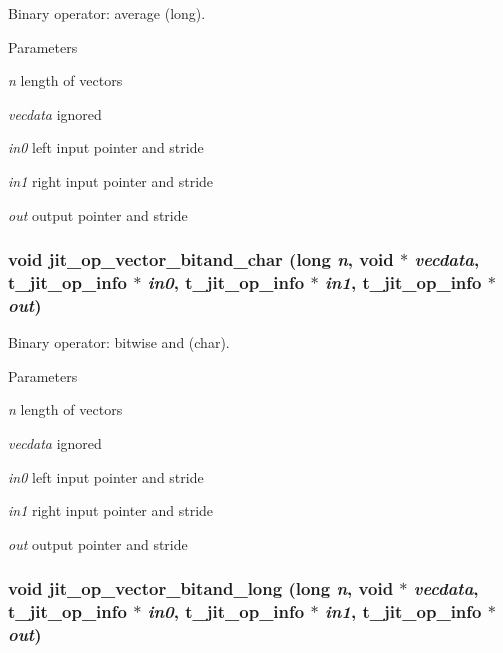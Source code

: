Binary operator: average (long). 
\begin{DoxyParams}{Parameters}
\item[{\em n}]length of vectors \item[{\em vecdata}]ignored \item[{\em in0}]left input pointer and stride \item[{\em in1}]right input pointer and stride \item[{\em out}]output pointer and stride \end{DoxyParams}
\hypertarget{group__opvecmod_ga06089d7ed6a436ec5b392fa5de518efd}{
\subsubsection[{jit\_\-op\_\-vector\_\-bitand\_\-char}]{\setlength{\rightskip}{0pt plus 5cm}void jit\_\-op\_\-vector\_\-bitand\_\-char (long {\em n}, \/  void $\ast$ {\em vecdata}, \/  {\bf t\_\-jit\_\-op\_\-info} $\ast$ {\em in0}, \/  {\bf t\_\-jit\_\-op\_\-info} $\ast$ {\em in1}, \/  {\bf t\_\-jit\_\-op\_\-info} $\ast$ {\em out})}}
\label{group__opvecmod_ga06089d7ed6a436ec5b392fa5de518efd}


Binary operator: bitwise and (char). 
\begin{DoxyParams}{Parameters}
\item[{\em n}]length of vectors \item[{\em vecdata}]ignored \item[{\em in0}]left input pointer and stride \item[{\em in1}]right input pointer and stride \item[{\em out}]output pointer and stride \end{DoxyParams}
\hypertarget{group__opvecmod_gaf3d07b5468bd0b35988292be07bcf33d}{
\subsubsection[{jit\_\-op\_\-vector\_\-bitand\_\-long}]{\setlength{\rightskip}{0pt plus 5cm}void jit\_\-op\_\-vector\_\-bitand\_\-long (long {\em n}, \/  void $\ast$ {\em vecdata}, \/  {\bf t\_\-jit\_\-op\_\-info} $\ast$ {\em in0}, \/  {\bf t\_\-jit\_\-op\_\-info} $\ast$ {\em in1}, \/  {\bf t\_\-jit\_\-op\_\-info} $\ast$ {\em out})}}
\label{group__opvecmod_gaf3d07b5468bd0b35988292be07bcf33d}


